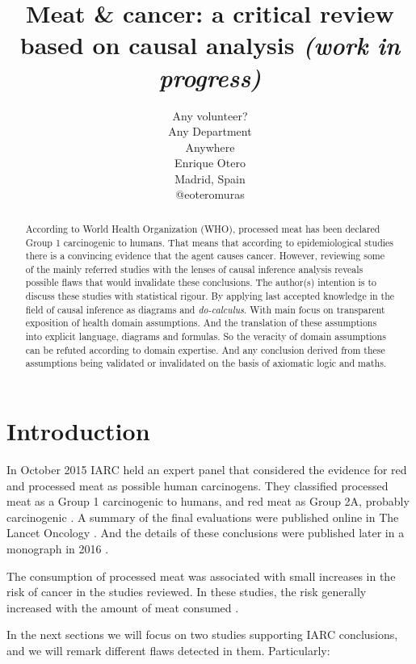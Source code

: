 \documentclass{article}
\title{Meat \& cancer: a critical review based on causal analysis \it{(work in progress)}}
\author{
  Any volunteer? \\
Any Department\\
  Anywhere\\
   \And
 Enrique Otero \\
  Madrid, Spain\\
  @eoteromuras \\
}
\begin{document}
\maketitle

\begin{abstract}
According to World Health Organization (WHO), processed meat has been declared Group 1 carcinogenic to humans. That means that according to epidemiological studies there is a convincing evidence that the agent causes cancer. However, reviewing some of the mainly referred studies with the lenses of causal inference analysis reveals possible flaws that would invalidate these conclusions. The author(s) intention is to discuss these studies with statistical rigour. By applying last accepted knowledge in the field of causal inference as diagrams and \textit{do-calculus}. With main focus on transparent exposition of health domain assumptions. And the translation of these assumptions into explicit language, diagrams and formulas. So the veracity of domain assumptions can be refuted according to domain expertise. And any conclusion derived from these assumptions being validated or invalidated on the basis of axiomatic logic and maths.

\end{abstract}




\section{Introduction}
 In October 2015 IARC held an expert panel that considered the evidence for red and processed meat as possible human carcinogens. They classified processed meat as a Group 1 carcinogenic to humans, and red meat as Group 2A, probably carcinogenic \cite{whoint}. A summary of the final evaluations were published online in The Lancet Oncology \cite{lancet}. And the details of these conclusions were published later in a monograph in 2016 \cite{monograph}.

The consumption of processed meat was associated with small increases in the risk of cancer in the studies reviewed. In these studies, the risk generally increased with the amount of meat consumed \cite{whoint}.


In the next sections we will focus on two studies supporting IARC conclusions, and we will remark different flaws detected in them. Particularly:
\end{document}
